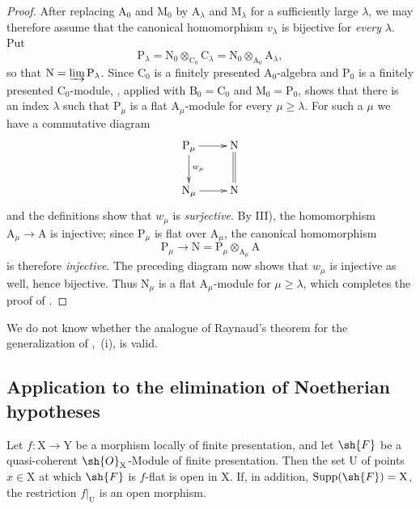 \begin{proof}
After replacing $\mathrm{A}_0$ and $\mathrm{M}_0$ by
$\mathrm{A}_\lambda$ and $\mathrm{M}_\lambda$ for a sufficiently large
$\lambda$, we may therefore assume that the canonical homomorphism
$v_\lambda$ is bijective for \emph{every} $\lambda$. Put
\[
  \mathrm{P}_\lambda
  =\mathrm{N}_0\otimes_{\mathrm{C}_0}\mathrm{C}_\lambda
  =\mathrm{N}_0\otimes_{\mathrm{A}_0}\mathrm{A}_\lambda,
\]
so that $\mathrm{N}=\varinjlim\mathrm{P}_\lambda$. Since
$\mathrm{C}_0$ is a finitely presented $\mathrm{A}_0$-algebra and
$\mathrm{P}_0$ is a finitely presented $\mathrm{C}_0$-module,
, applied with
$\mathrm{B}_0=\mathrm{C}_0$ and $\mathrm{M}_0=\mathrm{P}_0$, shows that
there is an index $\lambda$ such that $\mathrm{P}_\mu$ is a flat
$\mathrm{A}_\mu$-module for every $\mu\geqslant\lambda$. For such a
$\mu$ we have a commutative diagram
\[
\xymatrix{
  \mathrm{P}_\mu \ar[r] \ar[d]^{w_\mu} & \mathrm{N} \ar@{=}[d] \\
  \mathrm{N}_\mu \ar[r] & \mathrm{N}
}
\]
and the definitions show that $w_\mu$ is \emph{surjective}. By III), the
homomorphism $\mathrm{A}_\mu\to\mathrm{A}$ is injective; since
$\mathrm{P}_\mu$ is flat over $\mathrm{A}_\mu$, the canonical
homomorphism
\[
  \mathrm{P}_\mu\longrightarrow
  \mathrm{N}
  =\mathrm{P}_\mu\otimes_{\mathrm{A}_\mu}\mathrm{A}
\]
is therefore \emph{injective}. The preceding diagram now shows that
$w_\mu$ is injective as well, hence bijective. Thus
$\mathrm{N}_\mu$ is a flat $\mathrm{A}_\mu$-module for
$\mu\geqslant\lambda$, which completes the proof of
.
\end{proof}

\begin{remark}[11.2.10]
\label{IV.11.2.10}
We do not know whether the analogue of Raynaud's theorem for the
generalization of ,~(i), is valid.
\end{remark}

\subsection{Application to the elimination of Noetherian hypotheses}
\label{subsection:IV.11.3}
\label{IV.11.3}


\begin{theorem}[11.3.1]
\label{IV.11.3.1}
Let $f:\mathrm{X}\to\mathrm{Y}$ be a morphism locally of finite
presentation, and let $\sh{F}$ be a quasi-coherent
$\sh{O}_\mathrm{X}$-Module of finite presentation. Then the set
$\mathrm{U}$ of points $x\in\mathrm{X}$ at which $\sh{F}$ is
$f$-flat is open in $\mathrm{X}$. If, in addition,
$\operatorname{Supp}(\sh{F})=\mathrm{X}$, the restriction
$f|_\mathrm{U}$ is an open morphism.
\end{theorem}


